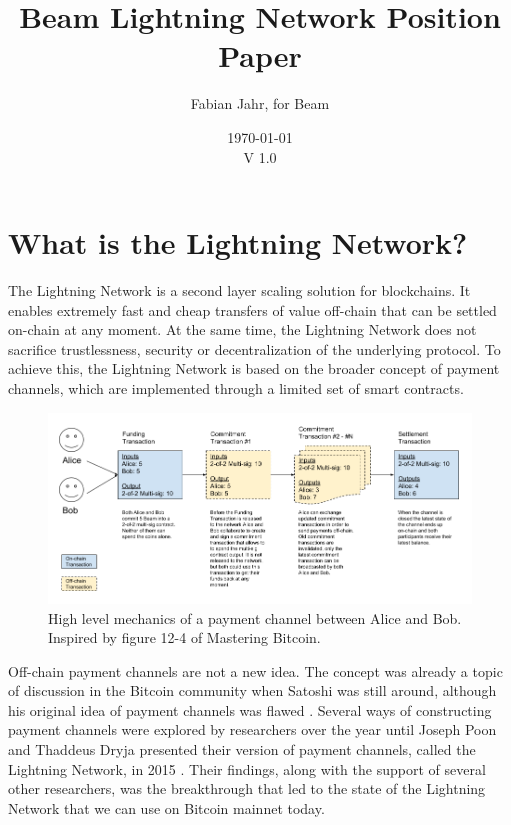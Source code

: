 \documentclass[letterpaper]{article}
\begin{document}
 
\title{Beam Lightning Network Position Paper}
\date{\today\\V 1.0}
\author{Fabian Jahr, for Beam}
 
\maketitle

\section{What is the Lightning Network?}
 The Lightning Network is a second layer scaling solution for blockchains. It enables extremely fast and cheap transfers of value off-chain that can be settled on-chain at any moment. At the same time, the Lightning Network does not sacrifice trustlessness, security or decentralization of the underlying protocol. To achieve this, the Lightning Network is based on the broader concept of payment channels, which are implemented through a limited set of smart contracts.

\begin{figure}[h]
	\centering
	\includegraphics[width=\textwidth]{payment_channel_high_level}
	\caption{High level mechanics of a payment channel between Alice and Bob. Inspired by figure 12-4 of Mastering Bitcoin.}
\end{figure}

Off-chain payment channels are not a new idea. The concept was already a topic of discussion in the Bitcoin community when Satoshi was still around, although his original idea of payment channels was flawed \cite{satoshi}. Several ways of constructing payment channels were explored by researchers over the year until Joseph Poon and Thaddeus Dryja presented their version of payment channels, called the Lightning Network, in 2015 \cite{lightning}. Their findings, along with the support of several other researchers, was the breakthrough that led to the state of the Lightning Network that we can use on Bitcoin mainnet today. 
\end{document}
